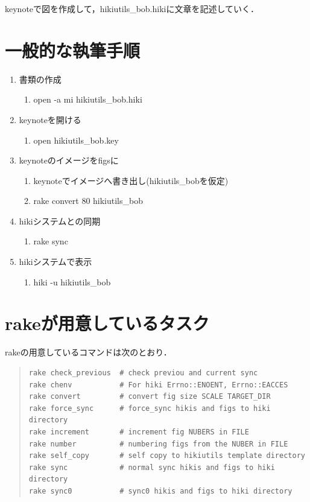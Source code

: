 \documentclass[12pt,a4paper]{jsarticle}
\begin{document}
keynoteで図を作成して，hikiutils\_bob.hikiに文章を記述していく．

\section{一般的な執筆手順}\begin{enumerate}
\item 書類の作成\begin{enumerate}
\item open -a mi hikiutils\_bob.hiki
\end{enumerate}
\item keynoteを開ける\begin{enumerate}
\item open hikiutils\_bob.key
\end{enumerate}
\item keynoteのイメージをfigsに\begin{enumerate}
\item keynoteでイメージへ書き出し(hikiutils\_bobを仮定)
\item rake convert 80 hikiutils\_bob
\end{enumerate}
\item hikiシステムとの同期\begin{enumerate}
\item rake sync
\end{enumerate}
\item hikiシステムで表示\begin{enumerate}
\item hiki -u hikiutils\_bob
\end{enumerate}
\end{enumerate}
\section{rakeが用意しているタスク}
rakeの用意しているコマンドは次のとおり．
\begin{quote}\begin{verbatim}
rake check_previous  # check previou and current sync
rake chenv           # For hiki Errno::ENOENT, Errno::EACCES
rake convert         # convert fig size SCALE TARGET_DIR
rake force_sync      # force_sync hikis and figs to hiki directory
rake increment       # increment fig NUBERS in FILE
rake number          # numbering figs from the NUBER in FILE
rake self_copy       # self copy to hikiutils template directory
rake sync            # normal sync hikis and figs to hiki directory
rake sync0           # sync0 hikis and figs to hiki directory
\end{verbatim}\end{quote}
\end{document}

